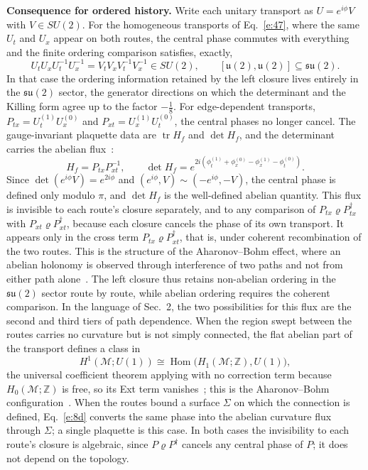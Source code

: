 \documentclass[10pt]{article}
\newcommand{\tr}{\operatorname{tr}}
\begin{document}
\smallskip
\noindent\textbf{Consequence for ordered history.} Write each unitary transport as $U=e^{i\phi}V$ with $V\in SU(2)$. For the homogeneous transports of Eq.~\eqref{e:47}, where the same $U_t$ and $U_x$ appear on both routes, the central phase commutes with everything and the finite ordering comparison satisfies, exactly,
\begin{equation}
U_tU_xU_t^{-1}U_x^{-1}=V_tV_xV_t^{-1}V_x^{-1}\in SU(2),\qquad [\mathfrak u(2),\mathfrak u(2)]\subseteq\mathfrak{su}(2).\label{e:53}
\end{equation}
In that case the ordering information retained by the left closure lives entirely in the $\mathfrak{su}(2)$ sector, the generator directions on which the determinant and the Killing form agree up to the factor $-\frac18$. For edge-dependent transports, $P_{tx}=U_t^{(1)}U_x^{(0)}$ and $P_{xt}=U_x^{(1)}U_t^{(0)}$, the central phases no longer cancel. The gauge-invariant plaquette data are $\tr H_f$ and $\det H_f$, and the determinant carries the abelian flux~\cite{wilson,roiesnel}:
\begin{equation}
H_f=P_{tx}P_{xt}^{-1},\qquad \det H_f=e^{2i(\phi_t^{(1)}+\phi_x^{(0)}-\phi_x^{(1)}-\phi_t^{(0)})}.\label{e:54}
\end{equation}
Since $\det(e^{i\phi}V)=e^{2i\phi}$ and $(e^{i\phi},V)\sim(-e^{i\phi},-V)$, the central phase is defined only modulo $\pi$, and $\det H_f$ is the well-defined abelian quantity. This flux is invisible to each route's closure separately, and to any comparison of $P_{tx}\varrho P_{tx}^\dagger$ with $P_{xt}\varrho P_{xt}^\dagger$, because each closure cancels the phase of its own transport. It appears only in the cross term $P_{tx}\varrho P_{xt}^\dagger$, that is, under coherent recombination of the two routes. This is the structure of the Aharonov--Bohm effect, where an abelian holonomy is observed through interference of two paths and not from either path alone~\cite{ab,wuyang}. The left closure thus retains non-abelian ordering in the $\mathfrak{su}(2)$ sector route by route, while abelian ordering requires the coherent comparison. In the language of Sec.~2, the two possibilities for this flux are the second and third tiers of path dependence. When the region swept between the routes carries no curvature but is not simply connected, the flat abelian part of the transport defines a class in
\begin{equation}
H^1(\mathcal M;U(1))\cong\operatorname{Hom}\bigl(H_1(\mathcal M;\mathbb Z),U(1)\bigr),\label{e:54a}
\end{equation}
the universal coefficient theorem applying with no correction term because $H_0(\mathcal M;\mathbb Z)$ is free, so its Ext term vanishes~\cite{hatcher}; this is the Aharonov--Bohm configuration~\cite{ab,wuyang}. When the routes bound a surface $\Sigma$ on which the connection is defined, Eq.~\eqref{e:8d} converts the same phase into the abelian curvature flux through $\Sigma$; a single plaquette is this case. In both cases the invisibility to each route's closure is algebraic, since $P\varrho P^\dagger$ cancels any central phase of $P$; it does not depend on the topology.
\end{document}
